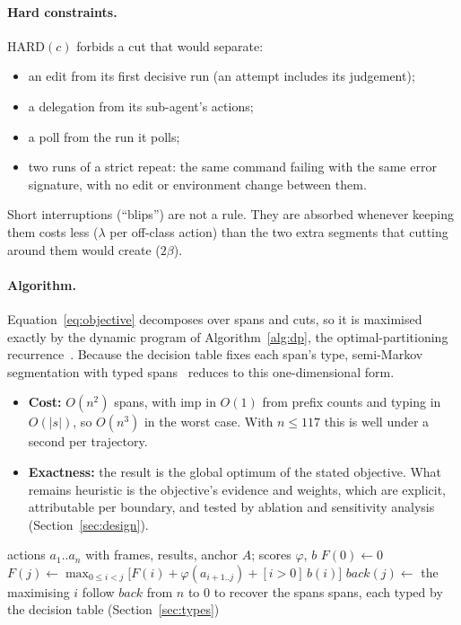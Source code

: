 \documentclass[sigconf,nonacm,10pt]{acmart}
\begin{document}
\paragraph{Hard constraints.} $\mathrm{HARD}(c)$ forbids a cut that would separate:
\begin{itemize}
  \item an edit from its first decisive run (an attempt includes its judgement);
  \item a delegation from its sub-agent's actions;
  \item a poll from the run it polls;
  \item two runs of a strict repeat: the same command failing with the same error
        signature, with no edit or environment change between them.
\end{itemize}
Short interruptions (``blips'') are not a rule. They are absorbed whenever keeping them
costs less ($\lambda$ per off-class action) than the two extra segments that cutting
around them would create ($2\beta$).

\paragraph{Algorithm.} Equation~\ref{eq:objective} decomposes over spans and cuts, so it
is maximised exactly by the dynamic program of Algorithm~\ref{alg:dp}, the
optimal-partitioning recurrence~\cite{jackson2005optimal,killick2012pelt}. Because the
decision table fixes each span's type, semi-Markov segmentation with typed
spans~\cite{sarawagi2004semicrf} reduces to this one-dimensional form.
\begin{itemize}
  \item \textbf{Cost:} $O(n^2)$ spans, with $\mathrm{imp}$ in $O(1)$ from prefix counts
        and typing in $O(|s|)$, so $O(n^3)$ in the worst case. With $n\le117$ this is
        well under a second per trajectory.
  \item \textbf{Exactness:} the result is the global optimum of the stated objective.
        What remains heuristic is the objective's evidence and weights, which are
        explicit, attributable per boundary, and tested by ablation and sensitivity
        analysis (Section~\ref{sec:design}).
\end{itemize}

\begin{algorithm}[t]
\caption{Outcome-anchored optimal partitioning}
\label{alg:dp}
\begin{algorithmic}[1]
\Require actions $a_1..a_n$ with frames, results, anchor $A$; scores $\varphi$, $b$
\State $F(0) \gets 0$
  \State $F(j) \gets \max_{0\le i<j}\big[F(i) + \varphi(a_{i+1..j}) + [i>0]\,b(i)\big]$
  \State $\mathit{back}(j) \gets$ the maximising $i$
\EndFor
\State follow $\mathit{back}$ from $n$ to $0$ to recover the spans
\State \Return spans, each typed by the decision table (Section~\ref{sec:types})
\end{algorithmic}
\end{algorithm}
\end{document}

